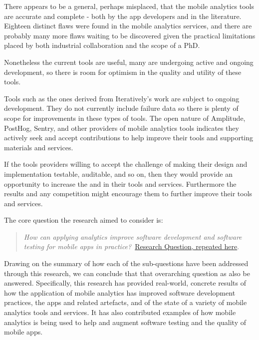 There appears to be a general, perhaps misplaced,  that the mobile analytics tools are accurate and complete - both by the app developers and in the literature. Eighteen distinct flaws were found in the mobile analytics services, and there are probably many more flaws waiting to be discovered given the practical limitations placed by both industrial collaboration and the scope of a PhD. 

Nonetheless the current tools are useful, many are undergoing active and ongoing development, so there is room for optimism in the quality and utility of these tools.


Tools such as the ones derived from Iteratively's work are subject to ongoing development. They do not currently include failure data so there is plenty of scope for improvements in these types of tools.  The open nature of Amplitude, PostHog, Sentry, and other providers of mobile analytics tools indicates they actively seek and accept contributions to help improve their tools and supporting materials and services. 

If the tools providers willing to accept the challenge of making their design and implementation testable, auditable, and so on, then they would provide an opportunity to increase the  and  in their tools and services. Furthermore the results and any competition might encourage them to further improve their tools and services.


The core question the research aimed to consider is:
\begin{quote}
  \emph{How can applying analytics improve software development and software testing for mobile apps in practice?}~\href{overall-research-question}{Research Question, repeated here}.
\end{quote}

Drawing on the summary of how each of the sub-questions have been addressed through this research, we can conclude that that overarching question as also be answered. Specifically, this research has provided real-world, concrete results of how the application of mobile analytics has improved software development practices, the apps and related artefacts, and of the state of a variety of mobile analytics tools and services. It has also contributed examples of how mobile analytics is being used to help and augment software testing and the quality of mobile apps. 


